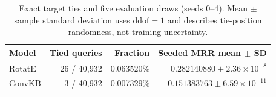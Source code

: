 \begin{table}[t]
\centering
\small
\setlength{\tabcolsep}{3pt}
\caption{Exact target ties and five evaluation draws (seeds 0--4). Mean $\pm$ sample standard deviation uses $\mathrm{ddof}=1$ and describes tie-position randomness, not training uncertainty.}
\label{tab:gosha-ties}
\begin{tabular*}{\textwidth}{@{\extracolsep{\fill}}lrrr@{}}
\toprule
Model & Tied queries & Fraction & Seeded MRR mean $\pm$ SD \\
\midrule
RotatE & 26 / 40,932 & 0.063520\% & $0.282140880\pm 2.36\times10^{-8}$ \\
ConvKB & 3 / 40,932 & 0.007329\% & $0.151383763\pm 6.59\times10^{-11}$ \\
\bottomrule
\end{tabular*}
\end{table}
